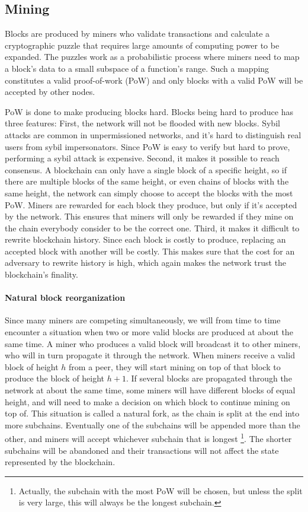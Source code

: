 \subsection{Mining}

Blocks are produced by miners who validate transactions and calculate a cryptographic puzzle that requires large amounts of computing power to be expanded. The puzzles work as a probabilistic process where miners need to map a block's data to a small subspace of a function's range. Such a mapping constitutes a valid proof-of-work (PoW) and only blocks with a valid PoW will be accepted by other nodes. 

PoW is done to make producing blocks hard. Blocks being hard to produce has three features: First, the network will not be flooded with new blocks. Sybil attacks are common in unpermissioned networks, and it's hard to distinguish real users from sybil impersonators. Since PoW is easy to verify but hard to prove, performing a sybil attack is expensive. Second, it makes it possible to reach consensus. A blockchain can only have a single block of a specific height, so if there are multiple blocks of the same height, or even chains of blocks with the same height, the network can simply choose to accept the blocks with the most PoW. Miners are rewarded for each block they produce, but only if it's accepted by the network. This ensures that miners will only be rewarded if they mine on the chain everybody consider to be the correct one. Third, it makes it difficult to rewrite blockchain history. Since each block is costly to produce, replacing an accepted block with another will be costly. This makes sure that the cost for an adversary to rewrite history is high, which again makes the network trust the blockchain's finality.

\paragraph{Natural block reorganization}
Since many miners are competing simultaneously, we will from time to time encounter a situation when two or more valid blocks are produced at about the same time. A miner who produces a valid block will broadcast it to other miners, who will in turn propagate it through the network. When miners receive a valid block of height $h$ from a peer, they will start mining on top of that block to produce the block of height $h+1$. If several blocks are propagated through the network at about the same time, some miners will have different blocks of equal height, and will need to make a decision on which block to continue mining on top of. This situation is called a natural fork, as the chain is split at the end into more subchains. Eventually one of the subchains will be appended more than the other, and miners will accept whichever subchain that is longest \footnote{Actually, the subchain with the most PoW will be chosen, but unless the split is very large, this will always be the longest subchain.}. The shorter subchains will be abandoned and their transactions will not affect the state represented by the blockchain.

